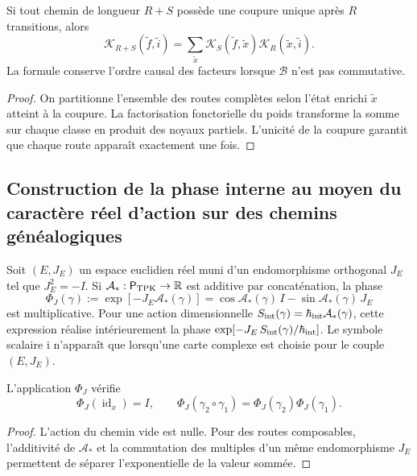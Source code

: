 \begin{proposition}
\label{prop:composicion-kernel-enriquecido-rev2}
Si tout chemin de longueur \(R+S\) possède une coupure unique après \(R\) transitions, alors
\[
 \mathcal K_{R+S}(\widetilde f,\widetilde i)
 =\sum_{\widetilde x}
 \mathcal K_S(\widetilde f,\widetilde x)
 \mathcal K_R(\widetilde x,\widetilde i).
\]
La formule conserve l’ordre causal des facteurs lorsque \(\mathcal B\) n’est pas
commutative.
\end{proposition}

\begin{proof}
On partitionne l’ensemble des routes complètes selon l’état enrichi
\(\widetilde x\) atteint à la coupure. La factorisation fonctorielle du poids
transforme la somme sur chaque classe en produit des noyaux partiels.
L’unicité de la coupure garantit que chaque route apparaît exactement une fois.
\end{proof}

\subsection{Construction de la phase interne au moyen du caractère réel d'action sur des chemins généalogiques}

Soit \((E,J_E)\) un espace euclidien réel muni d’un endomorphisme
orthogonal \(J_E\) tel que \(J_E^2=-I\). Si
\(\mathcal A_*:\mathsf P_{\rm TPK}\to\mathbb R\) est additive par
concaténation, la phase
\begin{equation}
 \Phi_J(\gamma)
 :=\exp[-J_E\mathcal A_*(\gamma)]
 =\cos\mathcal A_*(\gamma)\,I
  -\sin\mathcal A_*(\gamma)\,J_E
 \label{eq:fase-interna-caminos-rev2}
\end{equation}
est multiplicative. Pour une action dimensionnelle \(S_{\rm int}(\gamma)=\hbar_{\rm int}\mathcal A_*(\gamma)\), cette expression réalise intérieurement la phase \(\exp[-J_E\,S_{\rm int}(\gamma)/\hbar_{\rm int}]\). Le symbole scalaire \(\mathrm i\) n’apparaît que lorsqu’une carte complexe est choisie pour le couple \((E,J_E)\).

\begin{proposition}
\label{prop:fase-interna-functor-rev2}
L’application \(\Phi_J\) vérifie
\[
 \Phi_J(\operatorname{id}_x)=I,
 \qquad
 \Phi_J(\gamma_2\circ\gamma_1)
 =\Phi_J(\gamma_2)\Phi_J(\gamma_1).
\]
\end{proposition}

\begin{proof}
L’action du chemin vide est nulle. Pour des routes composables, l’additivité de
\(\mathcal A_*\) et la commutation des multiples d’un même endomorphisme
\(J_E\) permettent de séparer l’exponentielle de la valeur sommée.
\end{proof}


